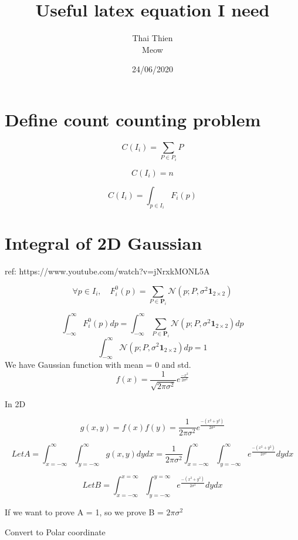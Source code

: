 \documentclass[a4paper]{article}
\title{Useful latex equation I need}
\author{Thai Thien\\
        Meow\\
}
\date{24/06/2020}
\theoremstyle{definition}
\theoremstyle{plain}
\begin{document}
\maketitle


\section{Define count counting problem}

\[ C(I_i) = \sum_{P \in P_{i}} P \]

\[ C(I_i) = n \]


\[ C(I_i) = \int_{p \in I_{i}} F_{i}(p) \]





\section{Integral of 2D Gaussian}

ref: https://www.youtube.com/watch?v=jNrxkMONL5A

\[ \forall p \in I_{i}, \quad F_{i}^{0}(p)=\sum_{P \in \mathbf{P}_{i}} \mathcal{N}\left(p ; P, \sigma^{2} \mathbf{1}_{2 \times 2}\right) \]


\[ \int_{-\infty}^{\infty}   F_{i}^{0}(p) dp = \int_{-\infty}^{\infty} \sum_{P \in \mathbf{P}_{i}} \mathcal{N}\left(p ; P, \sigma^{2} \mathbf{1}_{2 \times 2}\right) dp \]
\[ \int_{-\infty}^{\infty}\mathcal{N}\left(p ; P, \sigma^{2} \mathbf{1}_{2 \times 2}\right) dp = 1 \]
We have Gaussian function with mean = 0 and std.
\[ f(x) = \frac{1}{\sqrt{2\pi\sigma^2}} e^\frac{-x^2}{2\sigma^2} \]


In 2D

\[ g(x, y) = f(x)f(y) = \frac{1}{2\pi\sigma^2} e^\frac{-(x^2+y^2)}{2\sigma^2} \]



\[ Let A = \int_{x=-\infty}^{\infty}\int_{y=-\infty}^{\infty} g(x,y)dydx = \frac{1}{2\pi\sigma^2} \int_{x=-\infty}^{\infty}\int_{y=-\infty}^{\infty} e^\frac{-(x^2+y^2)}{2\sigma^2} dydx\]

\[ Let B =  \int_{x=-\infty}^{x=\infty}\int_{y=-\infty}^{y=\infty} e^\frac{-(x^2+y^2)}{2\sigma^2} dydx\]

If we want to prove A = 1, so we prove B = $2\pi\sigma^2$

Convert to Polar coordinate 
\end{document}
